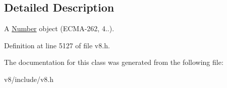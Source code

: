 \subsection{Detailed Description}
A \mbox{\hyperlink{classv8_1_1Number}{Number}} object (E\+C\+M\+A-\/262, 4..). 

Definition at line 5127 of file v8.\+h.



The documentation for this class was generated from the following file\+:\begin{DoxyCompactItemize}
\item 
v8/include/v8.\+h\end{DoxyCompactItemize}
